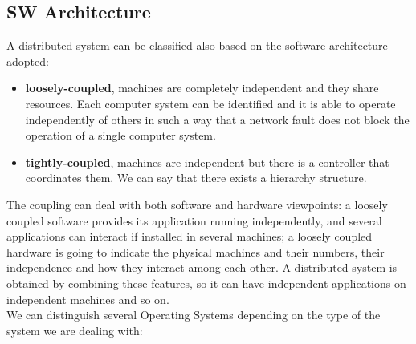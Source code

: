 \documentclass[11pt,a4paper]{article}
\begin{document}
\subsection{SW Architecture}
A distributed system can be classified also based on the software architecture adopted:
\begin{itemize}
    \item \textbf{loosely-coupled}, machines are completely independent and they share resources. Each computer system can be identified and it is able to operate independently of others in such a way that a network fault does not block the operation of a single computer system.  
    \item \textbf{tightly-coupled},  machines are independent but there is a controller that coordinates them. We can say that there exists a hierarchy structure.
\end{itemize}
The coupling can deal with both software and hardware viewpoints: a loosely coupled software provides its application running independently, and several applications can interact if installed in several machines; a loosely coupled hardware is going to indicate the physical machines and their numbers, their independence and how they interact among each other. A distributed system is obtained by combining these features, so it can have independent applications on independent machines and so on.\\
We can distinguish several Operating Systems depending on the type of the system we are dealing with:
\end{document}
